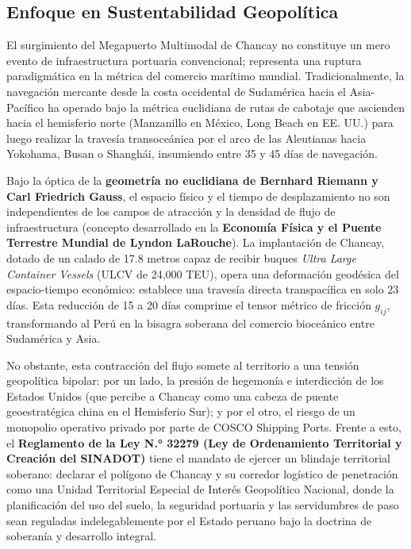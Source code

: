 \documentclass[11pt,a4paper]{article}
\begin{document}
\subsection{Enfoque en Sustentabilidad Geopolítica}
El surgimiento del Megapuerto Multimodal de Chancay no constituye un mero evento de infraestructura portuaria convencional; representa una ruptura paradigmática en la métrica del comercio marítimo mundial. Tradicionalmente, la navegación mercante desde la costa occidental de Sudamérica hacia el Asia-Pacífico ha operado bajo la métrica euclidiana de rutas de cabotaje que ascienden hacia el hemisferio norte (Manzanillo en México, Long Beach en EE. UU.) para luego realizar la travesía transoceánica por el arco de las Aleutianas hacia Yokohama, Busan o Shanghái, insumiendo entre 35 y 45 días de navegación.

Bajo la óptica de la \textbf{geometría no euclidiana de Bernhard Riemann y Carl Friedrich Gauss}, el espacio físico y el tiempo de desplazamiento no son independientes de los campos de atracción y la densidad de flujo de infraestructura (concepto desarrollado en la \textbf{Economía Física y el Puente Terrestre Mundial de Lyndon LaRouche}). La implantación de Chancay, dotado de un calado de 17.8 metros capaz de recibir buques \emph{Ultra Large Container Vessels} (ULCV de 24,000 TEU), opera una deformación geodésica del espacio-tiempo económico: establece una travesía directa transpacífica en solo 23 días. Esta reducción de 15 a 20 días comprime el tensor métrico de fricción $g_{ij}$, transformando al Perú en la bisagra soberana del comercio bioceánico entre Sudamérica y Asia.

No obstante, esta contracción del flujo somete al territorio a una tensión geopolítica bipolar: por un lado, la presión de hegemonía e interdicción de los Estados Unidos (que percibe a Chancay como una cabeza de puente geoestratégica china en el Hemisferio Sur); y por el otro, el riesgo de un monopolio operativo privado por parte de COSCO Shipping Ports. Frente a esto, el \textbf{Reglamento de la Ley N.° 32279 (Ley de Ordenamiento Territorial y Creación del SINADOT)} tiene el mandato de ejercer un blindaje territorial soberano: declarar el polígono de Chancay y su corredor logístico de penetración como una Unidad Territorial Especial de Interés Geopolítico Nacional, donde la planificación del uso del suelo, la seguridad portuaria y las servidumbres de paso sean reguladas indelegablemente por el Estado peruano bajo la doctrina de soberanía y desarrollo integral.
\end{document}
